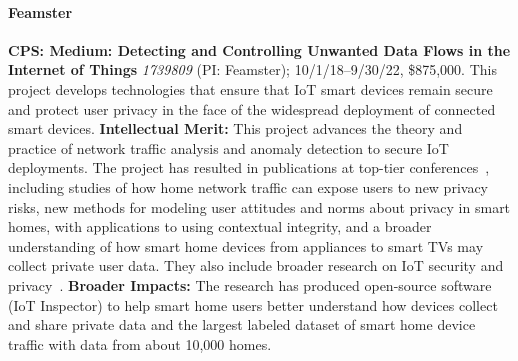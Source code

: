 \paragraph{Feamster}
\textbf{CPS: Medium: Detecting and Controlling Unwanted
Data Flows in the Internet of Things} \textit{1739809} (PI: Feamster);
10/1/18--9/30/22, \$875,000.
This
project develops technologies that ensure that IoT smart devices remain secure
and protect user privacy in the face of the widespread deployment of connected
smart devices.
\textbf{Intellectual Merit:} This project advances the theory and practice of network traffic
analysis and anomaly detection to secure IoT deployments. The project
has resulted in publications at top-tier
conferences~\cite{hooman2019:ccs,chu2018:iot:iotj,zheng2018:iot:cscw,feamster2018:iot:ctlj,doshi2018:iot,apthorpe2018:iot:imwut,datta2018:iot,acar2018:iot,weinberg2019:iot:www}, including studies of how home network traffic can
expose users to new privacy risks, new methods for modeling user attitudes and
norms about
privacy in smart homes, with applications to using contextual integrity,
and a broader understanding of how smart home
devices from appliances to smart
TVs may
collect private user data. They also include broader research on IoT
security and
privacy~\cite{chu2018:iot:iotj,zheng2018:iot:cscw,feamster2018:iot:ctlj,doshi2018:iot,apthorpe2018:iot:imwut,datta2018:iot,acar2018:iot,weinberg2019:iot:www}.
\textbf{Broader Impacts:} The research
has produced open-source software (IoT Inspector) to help smart home users better understand
how devices collect and share private data and the largest
labeled dataset of smart home device traffic with data from about 10,000
homes.

